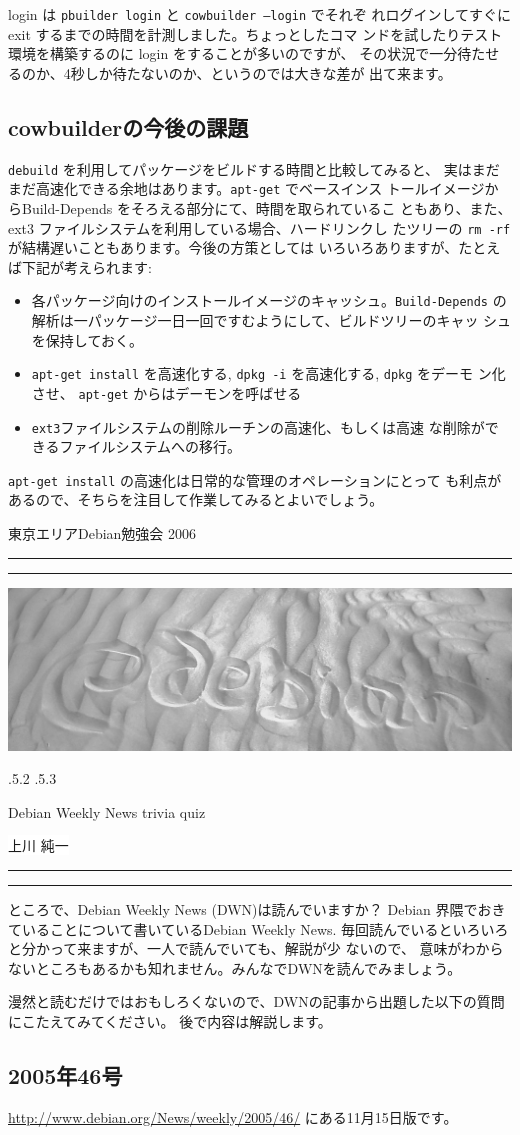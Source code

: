 \documentclass[mingoth,a4paper]{jsarticle}
\makeatletter
\renewcommand{\section}{\@startsection{section}{1}{\z@}%
    {\Cvs \@plus.5\Cdp \@minus.2\Cdp}%
    {.5\Cvs \@plus.3\Cdp}%
    {\normalfont\Huge\headfont\raggedright\centering}} %
\newcommand{\dancersection}[2]{%
\newpage
東京エリアDebian勉強会 2006
\hrule
\vspace{0.5mm}
\hrule
\hfill{}\includegraphics[width=16cm]{image2006-natsu/guruguru-sand-light.png}\\
\vspace{-5cm}
\begin{center}
\section{#1}
\end{center}
\hfill{}\colorbox{white}{#2}\hspace{3cm}\space\\
\vspace{1cm}
\hrule
\vspace{0.5mm}
\hrule
\vspace{1cm}
}
\makeatother
\begin{document}
login は \texttt{pbuilder login} と \texttt{cowbuilder --login} でそれぞ
れログインしてすぐに exit するまでの時間を計測しました。ちょっとしたコマ
ンドを試したりテスト環境を構築するのに login をすることが多いのですが、
その状況で一分待たせるのか、4秒しか待たないのか、というのでは大きな差が
出て来ます。

\subsection{cowbuilderの今後の課題}

\texttt{debuild} を利用してパッケージをビルドする時間と比較してみると、
実はまだまだ高速化できる余地はあります。\texttt{apt-get} でベースインス
トールイメージからBuild-Depends をそろえる部分にて、時間を取られているこ
ともあり、また、ext3 ファイルシステムを利用している場合、ハードリンクし
たツリーの \texttt{rm -rf} が結構遅いこともあります。今後の方策としては
いろいろありますが、たとえば下記が考えられます:

\begin{itemize}
 \item 各パッケージ向けのインストールイメージのキャッシュ。\texttt{Build-Depends} 
       の解析は一パッケージ一日一回ですむようにして、ビルドツリーのキャッ
       シュを保持しておく。
 \item \texttt{apt-get install} を高速化する, \texttt{dpkg -i} を高速化する, \texttt{dpkg} をデーモ
       ン化させ、 \texttt{apt-get} からはデーモンを呼ばせる
 \item \texttt{ext3}ファイルシステムの削除ルーチンの高速化、もしくは高速
       な削除ができるファイルシステムへの移行。
\end{itemize}

\texttt{apt-get install} の高速化は日常的な管理のオペレーションにとって
も利点があるので、そちらを注目して作業してみるとよいでしょう。


\newpage
\dancersection{Debian Weekly News trivia quiz}{上川 純一}

ところで、Debian Weekly News (DWN)は読んでいますか？
Debian 界隈でおきていることについて書いているDebian Weekly News.
毎回読んでいるといろいろと分かって来ますが、一人で読んでいても、解説が少
ないので、
意味がわからないところもあるかも知れません。みんなでDWNを読んでみましょう。

漫然と読むだけではおもしろくないので、DWNの記事から出題した以下の質問にこたえてみてください。
後で内容は解説します。



\subsection{2005年46号}
\url{http://www.debian.org/News/weekly/2005/46/}
にある11月15日版です。
\end{document}
